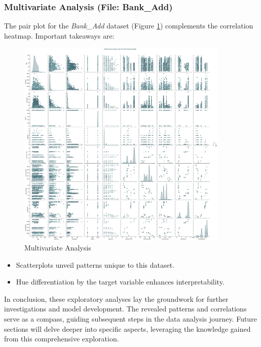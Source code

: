 \documentclass{article}
\begin{document}
\subsubsection{Multivariate Analysis  (File: Bank\_Add)}
The pair plot for the \textit{Bank\_Add} dataset (Figure \ref{fig:pair_plot_bank_add}) complements the correlation heatmap. Important takeaways are:
             \begin{figure}[h]
                \centering
                \includegraphics[width=0.9\textwidth]{data/bank_marketing/pic/Bank_Add_pairplot.png}
                \caption{Multivariate Analysis}
                \label{fig:pair_plot_bank_add}
            \end{figure}
            \begin{itemize}
                \item Scatterplots unveil patterns unique to this dataset.
                \item Hue differentiation by the target variable enhances interpretability.
                \vspace{300pt}   
            \end{itemize}

            In conclusion, these exploratory analyses lay the groundwork for further investigations and model development. The revealed patterns and correlations serve as a compass, guiding subsequent steps in the data analysis journey. Future sections will delve deeper into specific aspects, leveraging the knowledge gained from this comprehensive exploration.
\end{document}
